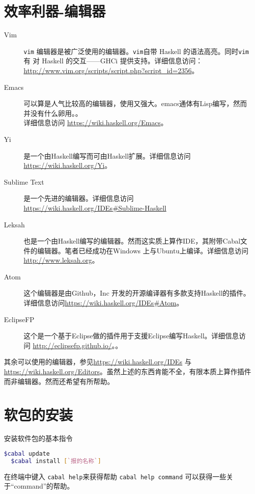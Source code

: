 \section{效率利器-编辑器}
\begin{description}
  \item[Vim]\verb"vim" 编辑器是被广泛使用的编辑器。\verb"vim"自带 Haskell 的语法高亮。同时\verb"vim" 有 对 Haskell 的交互——GHCi 提供支持。详细信息访问： \url{http://www.vim.org/scripts/script.php?script_id=2356}。
  \item[Emacs] 可以算是人气比较高的编辑器，使用又强大。emacs通体有Lisp编写，然而并没有什么卵用。。\\ 详细信息访问
  \url{https://wiki.haskell.org/Emacs}。
  \item[Yi]是一个由Haskell编写而可由Haskell扩展。详细信息访问 \url{https://wiki.haskell.org/Yi}。
  \item[Sublime Text]  是一个先进的编辑器。详细信息访问\url{https://wiki.haskell.org/IDEs#Sublime-Haskell}
  \item[Leksah] 也是一个由Haskell编写的编辑器。然而这实质上算作IDE，其附带Cabal文件的编辑器。笔者已经成功在Windows 上与Ubuntu上编译。详细信息访问\url{http://www.leksah.org}。
  \item[Atom] 这个编辑器是由Github，Inc 开发的开源编译器有多款支持Haskell的插件。详细信息访问\url{https://wiki.haskell.org/IDEs#Atom}。
  \item[EclipseFP] 这个是一个基于Eclipse做的插件用于支援Eclipse编写Haskell。详细信息访问 \url{http://eclipsefp.github.io/}。。
\end{description}
其余可以使用的编辑器，参见\url{https://wiki.haskell.org/IDEs} 与 \url{https://wiki.haskell.org/Editors}。虽然上述的东西肯能不全，有限本质上算作插件而非编辑器。然而还希望有所帮助。
\section{软包的安装}
安装软件包的基本指令
\begin{lstlisting}[language=bash]
  $cabal update
  $cabal install [`报的名称`]
\end{lstlisting}

在终端中键入 \lstinline[language=bash]{cabal help}来获得帮助 \lstinline[language=bash]{cabal help command} 可以获得一些关于“command”的帮助。
